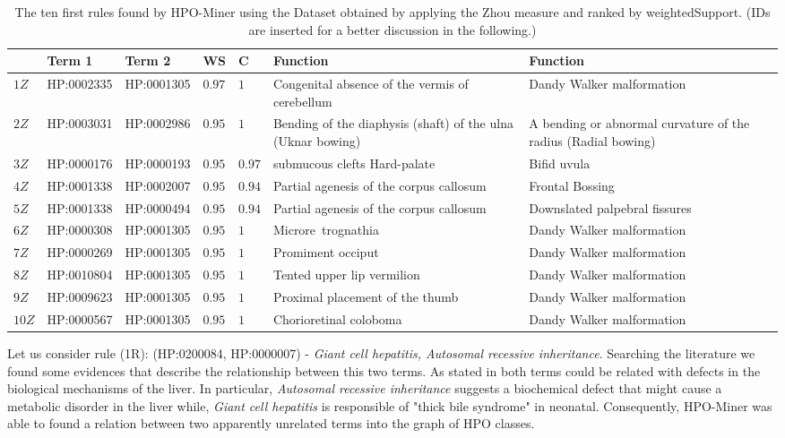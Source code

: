 \documentclass{article}
\theoremstyle{definition}
\begin{document}
\begin{table}[!h]

\caption{The ten first rules found by HPO-Miner using the Dataset obtained by applying the Zhou measure and ranked by weightedSupport. (IDs are inserted for a better discussion in the following.) }
\label{tab:Zhou}
\begin{tabular}{|p{0.55cm}|l|l|p{0.5cm}|p{0.5cm}|p{2.0cm}|p{2.0cm}|}
\hline 
\textbf{}&\textbf{Term 1}& \textbf{Term 2} & \textbf{WS} & \textbf{C} &\textbf{Function} & \textbf{Function }\\ 
\hline
$1Z$&	HP:0002335	&	HP:0001305	&$	0.97	$&$	1	$&	Congenital absence of the vermis of cerebellum	&	Dandy Walker malformation\\ 
\hline
$2Z$&	HP:0003031	&	HP:0002986	&$	0.95	$&$	1	$&	Bending of the diaphysis (shaft) of the ulna (Uknar bowing)	&	A bending or abnormal curvature of the radius (Radial bowing)\\ 
\hline
$3Z$&	HP:0000176	&	HP:0000193	&$	0.95	$&$	0.97	$&	submucous clefts Hard-palate	&	Bifid uvula\\ 
\hline
$4Z$&	HP:0001338	&	HP:0002007	&$	0.95	$&$	0.94	$&	Partial agenesis of the corpus callosum	&	Frontal Bossing\\ 
\hline
$5Z$&	HP:0001338	&	HP:0000494	&$	0.95	$&$	0.94	$&	Partial agenesis of the corpus callosum	&	Downslated palpebral fissures\\ 
\hline
$6Z$&	HP:0000308	&	HP:0001305	&$	0.95	$&$	1	$&	Microre~trognathia	&	Dandy Walker malformation\\ 
\hline
$7Z$&	HP:0000269	&	HP:0001305	&$	0.95	$&$	1	$&	Promiment occiput	&	Dandy Walker malformation\\ 
\hline
$8Z$&	HP:0010804	&	HP:0001305	&$	0.95	$&$	1	$&	Tented upper lip vermilion	&	Dandy Walker malformation\\ 
\hline
$9Z$&	HP:0009623	&	HP:0001305	&$	0.95	$&$	1	$&	Proximal placement of the thumb	&	Dandy Walker malformation\\ 
\hline
$10Z$&	HP:0000567	&	HP:0001305	&$	0.95	$&$	1	$&	Chorioretinal coloboma	&	Dandy Walker malformation\\ 
\hline
\end{tabular}
\end{table}


Let us consider rule (1R): (HP:0200084, HP:0000007) - \textit{Giant cell hepatitis, Autosomal recessive inheritance}. Searching the literature we found some evidences that describe the relationship between this two terms. As stated in \cite{Danks01051977} both terms could be related with defects in the biological mechanisms of the liver. In particular,
\textit{Autosomal recessive inheritance} suggests a biochemical defect that might cause a metabolic disorder in the liver while, \textit{Giant cell hepatitis} is responsible of "thick bile syndrome" in neonatal. Consequently, HPO-Miner was able to found a relation between two apparently unrelated terms into the graph of HPO classes.
\end{document}
